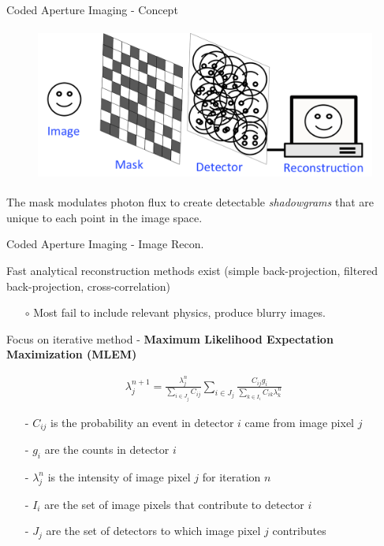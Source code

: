 \documentclass[xcolor=x11names,compress]{beamer}
\renewcommand{\(}{\begin{columns}}
\renewcommand{\)}{\end{columns}}
\newcommand{\<}[1]{\begin{column}{#1}}
\renewcommand{\>}{\end{column}}
\begin{document}
\begin{frame}{Coded Aperture Imaging - Concept}

\begin{figure}
\includegraphics[height=2in]{Figures/Smiley.png}
\end{figure}

The mask modulates photon flux to create detectable \emph{shadowgrams} that are unique to each point in the image space.

\end{frame}



\begin{frame}{Coded Aperture Imaging - Image Recon.}


Fast analytical reconstruction methods exist (simple back-projection, filtered back-projection, cross-correlation) \cite{Wahl,Fenimore}
\begin{itemize}
\item[$\circ$] Most fail to include relevant physics, produce blurry images.
\end{itemize}

\vspace{1ex}
Focus on iterative method - \textbf{Maximum Likelihood Expectation Maximization (MLEM)} \cite{Lange}


\vspace{-15pt}
 \begin{align*}
	\lambda_j^{n+1} = \frac{\lambda_j^n}{\sum\limits_{i \in J_j}C_{ij}} \sum_{i \in J_j} \frac{C_{ij}g_i}{\sum\limits_{k \in I_i}C_{ik}\lambda_k^n}\
\end{align*}

\vspace{-10pt}

\begin{itemize}
\small
\item[-] $C_{ij}$ is the probability an event in detector $i$ came from image pixel $j$
\item[-] $g_i$ are the counts in detector $i$
\item[-] $\lambda_j^n$ is the intensity of image pixel $j$ for iteration $n$
\item[-] $I_i$ are the set of image pixels that contribute to detector $i$
\item[-] $J_j$ are the set of detectors to which image pixel $j$ contributes
\end{itemize}
\end{frame}
\end{document}
